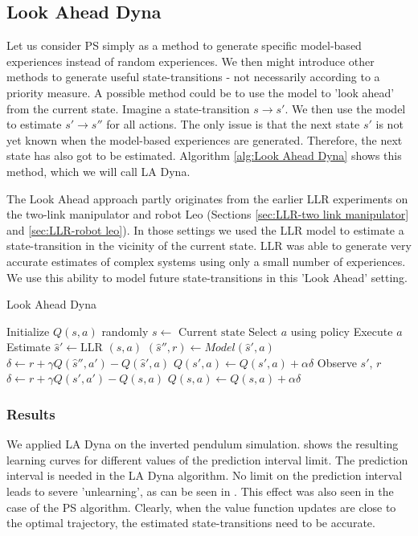\subsection{Look Ahead Dyna} 
Let us consider \ac{PS} simply as a method to generate specific model-based experiences instead of random experiences. We then might introduce other methods to generate useful state-transitions - not necessarily according to a priority measure. A possible method could be to use the model to 'look ahead' from the current state. Imagine a state-transition $s \rightarrow s'$. We then use the model to estimate $s' \rightarrow s''$ for all actions. The only issue is that the next state $s'$ is not yet known when the model-based experiences are generated. Therefore, the next state has also got to be estimated. Algorithm \ref{alg:Look Ahead Dyna} shows this method, which we will call \ac{LA Dyna}.

The Look Ahead approach partly originates from the earlier \ac{LLR} experiments on the two-link manipulator and robot Leo (Sections \ref{sec:LLR-two link manipulator} and \ref{sec:LLR-robot leo}). In those settings we used the \ac{LLR} model to estimate a state-transition in the vicinity of the current state. \ac{LLR} was able to generate very accurate estimates of complex systems using only a small number of experiences. We use this ability to model future state-transitions in this 'Look Ahead' setting.
\begin{algorithm}[ht]
	\caption{Look Ahead Dyna} \label{alg:Look Ahead Dyna}
	\begin{algorithmic}[1]
		\State Initialize $Q(s,a)$ randomly
			\State $s\gets \textrm{ Current state}$
			\State Select $a$ using policy
			\State Execute $a$ 
			\State Estimate $\hat{s}' \gets \textrm{LLR }(s,a)$
				\State $(\hat{s}'',r) \gets Model(\hat{s}',a)$
				\State $\delta \gets r + \gamma Q(\hat{s}'',a') - Q(\hat{s}',a)$
				\State $Q(s',a) \gets Q(s',a) + \alpha \delta$
			\EndFor
			\State Observe $s'$, $r$
			\State $\delta \gets r + \gamma Q(s',a') - Q(s,a)$
			\State $Q(s,a) \gets Q(s,a) + \alpha \delta$
		\EndFor
	\end{algorithmic}
\end{algorithm}


\subsubsection{Results}
We applied \ac{LA Dyna} on the inverted pendulum simulation.  shows the resulting learning curves for different values of the prediction interval limit. The prediction interval is needed in the \ac{LA Dyna} algorithm. No limit on the prediction interval leads to severe 'unlearning', as can be seen in . This effect was also seen in the case of the \ac{PS} algorithm. Clearly, when the value function updates are close to the optimal trajectory, the estimated state-transitions need to be accurate. 

